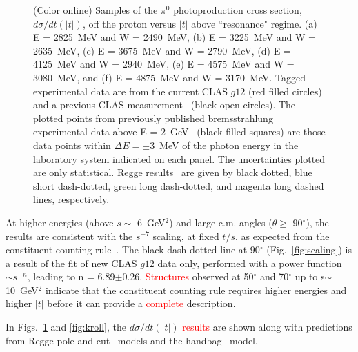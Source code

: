 \documentclass[aps,prc,twocolumn,floatfix,showpacs,preprintnumbers,amsmath,amssymb,superscriptaddress,linenumbers]{revtex4-1}
\begin{document}
\begin{figure}[htb!]
        \caption {(Color online) Samples of the $\pi^0$ photoproduction 
	cross section, $d\sigma/dt(|t|)$, off the proton versus $|t|$ 
	above ``resonance" regime.  
	(a) E = 2825~MeV and W = 2490~MeV, 
	(b) E = 3225~MeV and W = 2635~MeV,
	(c) E = 3675~MeV and W = 2790~MeV, 
	(d) E = 4125~MeV and W = 2940~MeV,
	(e) E = 4575~MeV and W = 3080~MeV, and
	(f) E = 4875~MeV and W = 3170~MeV.
	Tagged experimental data are from the current CLAS $g12$ (red 
	filled circles) and a previous CLAS 
	measurement~\protect\cite{Dugger:2007bt} (black open circles). 
	The plotted points from previously published bremsstrahlung 
	experimental data above E = 2~GeV~\protect\cite{brem} (black 
	filled squares) are those data points within $\Delta E = 
	\pm$3~MeV of the photon energy in the laboratory system 
	indicated on each panel. The uncertainties plotted are only 
	statistical. 
	Regge results~\protect\cite{Goldstein:1973xn,Laget:2005be,
	Mathieu:2015eia,Donnachie:2015jaa} are given by black dotted, 
	blue short dash-dotted, green long dash-dotted, and magenta 
	long dashed lines, respectively.} 
	\label{fig:t_data}
\end{figure}


At higher energies (above $s\sim$ 6~GeV$^2$) and large c.m. angles 
($\theta\geq$ 90$^\circ$), the results are consistent with 
the $s^{-7}$ scaling, at fixed $t/s$, as expected from the 
constituent counting rule~\cite{Brodsky:1973kr}. 
The black dash-dotted line at 90$^\circ$ (Fig.~\ref{fig:scaling}) 
is a result of the fit of new CLAS $g12$ data only, performed with a 
power function $\sim s^{-n}$, leading to n = 6.89$\pm$0.26.  
\textcolor{red}{Structures} observed at 50$^\circ$ and 70$^\circ$ up to 
s$\sim$10~GeV$^2$ indicate that the constituent 
counting rule requires higher energies and higher $|t|$ before it 
can provide a \textcolor{red}{complete} description.


In Figs.~\ref{fig:t_data} and \ref{fig:kroll}, the 
$d\sigma/dt(|t|)$ \textcolor{red}{results} are shown along with predictions from 
Regge pole and cut~\cite{Goldstein:1973xn,Laget:2005be,
Mathieu:2015eia,Donnachie:2015jaa} models and the 
handbag~\cite{Huang:2000kd} model. 
\end{document}
